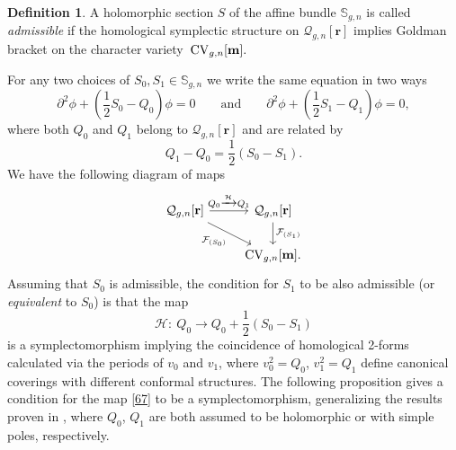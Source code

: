 \documentclass[pdftex]{sigma}
\numberwithin{equation}{section}
\theoremstyle{definition}
\newtheorem{Definition}[Theorem]{Definition}
\begin{document}
\begin{Definition}
A holomorphic section $S$ of the affine bundle $\mathbb{S}_{g,n}$ is called \textit{admissible} if the homological symplectic structure on $\mathcal{Q}_{g,n}[\mathbf{r}]$ implies Goldman bracket on the character variety~${\rm CV}_{g,n}[\mathbf{m}].$
\end{Definition}
For any two choices of $S_0, S_1 \in \mathbb{S}_{g,n} $ we write the same equation in two ways
\begin{equation*}%
\partial^2 \phi+\left(\frac{1}{2}S_0-Q_0 \right)\phi=0 \qquad \text{and}\qquad
\partial^2 \phi+\left(\frac{1}{2}S_1-Q_1 \right)\phi=0,
\end{equation*}
where both $Q_0$ and $Q_1 $ belong to $\mathcal{Q}_{g,n}[\mathbf{r}]$ and are related by
\begin{equation}\label{66}Q_1-Q_0=\frac{1}{2}(S_0 -S_1 ).\end{equation}
We have the following diagram of maps
\[
 \begin{tikzcd}
\mathcal{Q}_{g,n}[\mathbf{r}] \arrow[r, " Q_0 \xrightarrow{\mathcal{H}} Q_1"] \arrow[dr, "\mathcal{F}_{(S_0)}"']
& \mathcal{Q}_{g,n}[\mathbf{r}] \ar[d, "\mathcal{F}_{(S_1)}"]\\
& {\rm CV}_{g,n}[\mathbf{m}].
\end{tikzcd}
\]
Assuming that $S_0$ is admissible, the condition for $S_1$ to be also admissible (or \textit{equivalent} to $S_0$) is that the map
\begin{equation}\label{67}\mathcal{H}\colon \ Q_0 \xrightarrow{} Q_0 +\frac{1}{2}(S_0 -S_1 )\end{equation} is a symplectomorphism implying the coincidence of homological 2-forms calculated via the periods of $v_0$ and $v_1$, where $v_0^2=Q_0$, $v_1^2=Q_1 $ define canonical coverings with different conformal structures. The following proposition gives a condition for the map \eqref{67} to be a symplectomorphism, generalizing the results proven in \cite{Bertola_2017,korotkin2018periods}, where $Q_0$, $Q_1$ are both assumed to be holomorphic or with simple poles, respectively.
\end{document}
